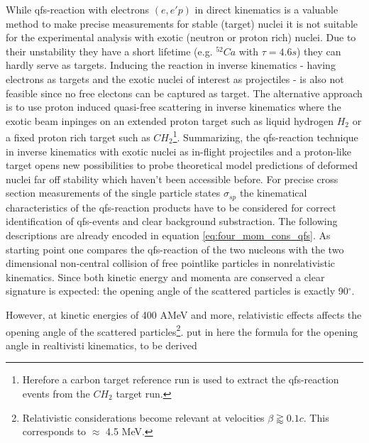 While qfs-reaction with electrons $(e,e'p)$ in direct kinematics is a valuable method to make precise measurements for stable (target) nuclei it is not suitable for the experimental analysis with exotic (neutron or proton rich) nuclei. Due to their unstability they have a short lifetime (e.g. $^{52}Ca$ with $\tau = 4.6s$) they can hardly serve as targets. Inducing the reaction in inverse kinematics - having electrons as targets and the exotic nuclei of interest as projectiles - is also not feasible since no free electons can be captured as target. The alternative approach is to use proton induced quasi-free scattering in inverse kinematics where the exotic beam inpinges on an extended proton target such as liquid hydrogen $H_2$  or a fixed proton rich target such as $CH_2$\footnote{Herefore a carbon target reference run is used to extract the qfs-reaction events from the $CH_2$ target run.}.\newline
Summarizing, the qfs-reaction technique in inverse kinematics with exotic nuclei as in-flight projectiles and a proton-like target opens new possibilities to probe theoretical model predictions of deformed nuclei far off stability which haven't been accessible before.\newline
For precise cross section measurements of the single particle states $\sigma_{sp}$ the kinematical characteristics of the qfs-reaction products have to be considered for correct identification of qfs-events and clear background substraction. The following descriptions are already encoded in equation \ref{eq:four_mom_cons_qfs}.\newline
As starting point one compares the qfs-reaction of the two nucleons with the two dimensional non-central collision of free pointlike particles in nonrelativistic kinematics. Since both kinetic energy and momenta are conserved a  clear signature is expected: the opening angle of the scattered particles is exactly 90$^{\circ}$. 

However, at kinetic energies of 400 AMeV and more, relativistic effects affects the opening angle of the scattered particles\footnote{Relativistic considerations become relevant at velocities $ \beta \gtrapprox 0.1 c$. This corresponds to $\approx$ 4.5 MeV.}. 
put in here the formula for the opening angle in realtivisti kinematics, to be derived

